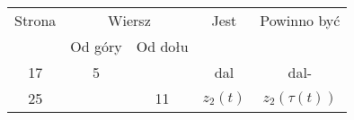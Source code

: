 \documentclass[a4paper,11pt]{article}
\begin{document}










\newpage


\vspace{0em}



\vspace{0em}


\begin{center}

  \begin{tabular}{|c|c|c|c|c|}
    \hline
    Strona & \multicolumn{2}{c|}{Wiersz} & Jest
                              & Powinno być \\ \cline{2-3}
    & Od góry & Od dołu & & \\
    \hline
    17  & \hphantom{0}5 & & dal & dal- \\
    25  & & 11 & $z_{ 2 }( t )$ & $z_{ 2 }( \tau( t ) )$ \\
    \hline
  \end{tabular}

\end{center}

\vspace{\spaceTwo}


















{}






\end{document}
